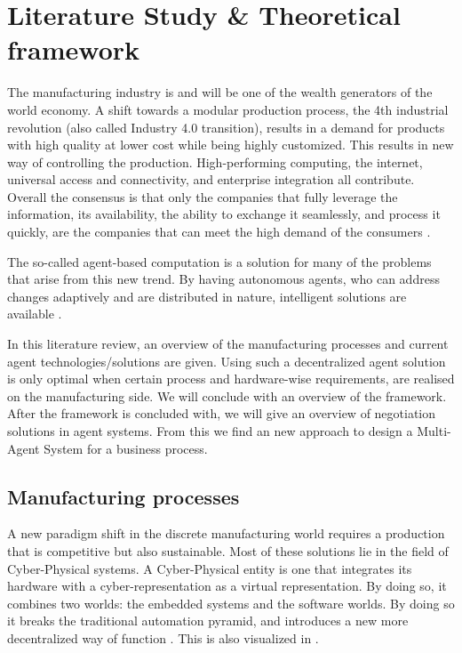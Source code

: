\chapter{Literature Study \& Theoretical framework}
\label{ch:literature}
The manufacturing industry is and will be one of the wealth generators of the world economy. A shift towards a modular production process, the 4th industrial revolution (also called Industry 4.0 transition), results in a demand for products with high quality at lower cost while being highly customized. This results in new way of controlling the production. High-performing computing, the internet, universal access and connectivity, and enterprise integration all contribute. Overall the consensus is that only the companies that fully leverage the information, its availability, the ability to exchange it seamlessly, and process it quickly, are the companies that can meet the high demand of the consumers \citep{monostori2006agent}. 

The so-called agent-based computation is a solution for many of the problems that arise from this new trend. By having autonomous agents, who can address changes adaptively and are distributed in nature, intelligent solutions are available \citep{monostori2006agent}.

In this literature review, an overview of the manufacturing processes and current agent technologies/solutions are given. Using such a decentralized agent solution is only optimal when certain process and hardware-wise requirements, are realised on the manufacturing side. We will conclude with an overview of the framework. After the framework is concluded with, we will give an overview of negotiation solutions in agent systems. From this we find an new approach to design a Multi-Agent System for a business process.

\section{Manufacturing processes}
	
A new paradigm shift in the discrete manufacturing world requires a production that is competitive but also sustainable. Most of these solutions lie in the field of Cyber-Physical systems. A Cyber-Physical entity is one that integrates its hardware with a cyber-representation as a virtual representation. By doing so, it combines two worlds: the embedded systems and the software worlds. By doing so it breaks the traditional automation pyramid, and introduces a new more decentralized way of function \citep{leitao2016smart}. This is also visualized in . %
	
